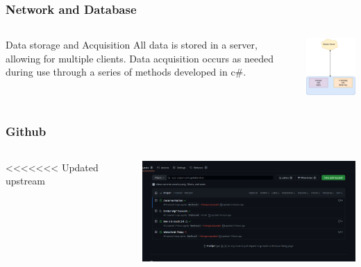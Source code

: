 \documentclass[aspectratio=169]{beamer}
\begin{document}
\begin{frame}
    \frametitle{Network and Database}

    \begin{columns}
        \begin{column}{0.48\textwidth}
            \begin{block}{Data storage and Acquisition}
                All data is stored in a server, allowing for multiple clients. Data acquisition occurs as needed during use through a series of methods developed in c\#.
            \end{block}
        \end{column}
        \begin{column}{0.48\textwidth}
            \includegraphics[width=5cm]{Simple Diagram.png}
        \end{column}
    \end{columns}
\end{frame}

\begin{frame}
    \frametitle{Github}

    \begin{columns}
        \begin{column}{0.28\textwidth}
<<<<<<< Updated upstream
        \end{column}
        \begin{column}{0.58\textwidth}
            \includegraphics[width=9cm]{github.png}
        \end{column}
    \end{columns}
\end{frame}
\end{document}
